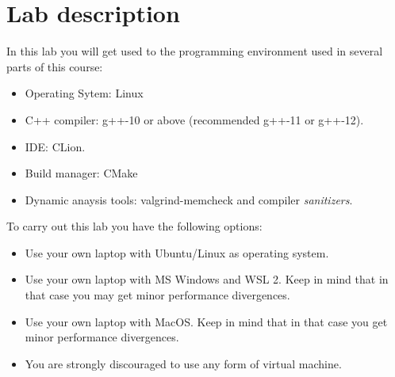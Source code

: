 \section{Lab description}

In this lab you will get used to the programming environment used in 
several parts of this course:

\begin{itemize}
  \item Operating Sytem: Linux
  \item C++ compiler: g++-10 or above (recommended g++-11 or g++-12).
  \item IDE: CLion.
  \item Build manager: CMake
  \item Dynamic anaysis tools: valgrind-memcheck and compiler \emph{sanitizers}.
\end{itemize}

To carry out this lab you have the following options:

\begin{itemize}
  \item Use your own laptop with Ubuntu/Linux as operating system.

  \item Use your own laptop with MS Windows and WSL 2.
        Keep in mind that in that case you may get minor performance divergences.

  \item Use your own laptop with MacOS.
        Keep in mind that in that case you get minor performance divergences.

  \item You are strongly discouraged to use any form of virtual machine.
\end{itemize}
